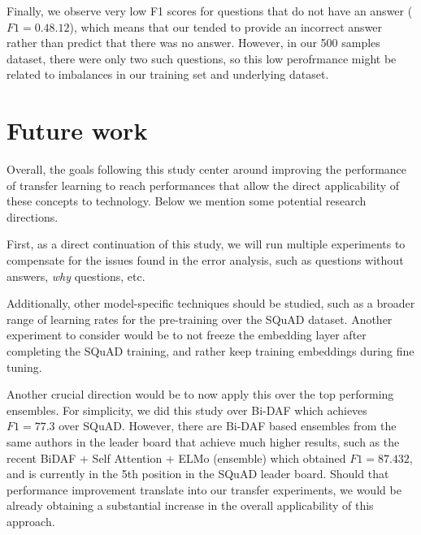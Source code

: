 \documentclass[11pt,a4paper]{article}
\begin{document}
Finally, we observe very low F1 scores for questions that do not have an answer ($F1 = 0.48.12$), which means that our tended to provide an incorrect answer rather than predict that there was no answer. However, in our 500 samples dataset, there were only two such questions, so this low perofrmance might be related to imbalances in our training set and underlying dataset.


\section{Future work}
\label{sec:next_steps}

Overall, the goals following this study center around improving the performance of transfer learning to reach performances that allow the direct applicability of these concepts to technology. Below we mention some potential research directions.

First, as a direct continuation of this study, we will run multiple experiments to compensate for the issues found in the error analysis, such as questions without answers, \textit{why} questions, etc.

Additionally, other model-specific techniques should be studied, such as a broader range of learning rates for the pre-training over the SQuAD dataset. Another experiment to consider would be to not freeze the embedding layer after completing the SQuAD training, and rather keep training embeddings during fine tuning.

Another crucial direction would be to now apply this over the top performing ensembles. For simplicity, we did this study over Bi-DAF which achieves $F1 = 77.3$ over SQuAD. However, there are Bi-DAF based ensembles from the same authors in the leader board that achieve much higher results, such as the recent BiDAF + Self Attention + ELMo (ensemble) which obtained $F1 = 87.432$, and is currently in the 5th position in the SQuAD leader board. Should that performance improvement translate into our transfer experiments, we would be already obtaining a substantial increase in the overall applicability of this approach.


%
%


\end{document}
